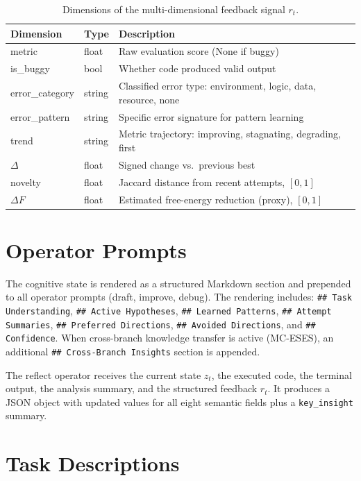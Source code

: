 \documentclass{article} %
\newcommand{\zt}{z_t}
\newcommand{\rt}{r_t}
\begin{document}
\begin{table}[ht]
\centering
\caption{Dimensions of the multi-dimensional feedback signal $\rt$.}
\label{tab:feedback_fields}
\small
\begin{tabular}{@{}llp{5.5cm}@{}}
\toprule
\textbf{Dimension} & \textbf{Type} & \textbf{Description} \\
\midrule
metric          & float  & Raw evaluation score (None if buggy) \\
is\_buggy       & bool   & Whether code produced valid output \\
error\_category & string & Classified error type: environment,
logic, data, resource, none \\
error\_pattern  & string & Specific error signature for pattern
learning \\
trend           & string & Metric trajectory: improving,
stagnating, degrading, first \\
$\Delta$        & float  & Signed change vs.\ previous best \\
novelty         & float  & Jaccard distance from recent attempts,
$[0, 1]$ \\
$\Delta F$      & float  & Estimated free-energy reduction (proxy),
$[0, 1]$ \\
\bottomrule
\end{tabular}
\end{table}


\section{Operator Prompts}
\label{sec:app_prompts}

The cognitive state is rendered as a structured Markdown section and prepended
to all operator prompts (draft, improve, debug). The rendering includes:
\texttt{\#\# Task Understanding}, \texttt{\#\# Active Hypotheses},
\texttt{\#\# Learned Patterns}, \texttt{\#\# Attempt Summaries},
\texttt{\#\# Preferred Directions}, \texttt{\#\# Avoided Directions},
and \texttt{\#\# Confidence}. When
cross-branch knowledge transfer is active (MC-ESES), an additional
\texttt{\#\# Cross-Branch Insights} section is appended.

The reflect operator receives the current state $\zt$, the executed code, the
terminal output, the analysis summary, and the structured feedback $\rt$. It
produces a JSON object with updated values for all eight semantic fields plus a
\texttt{key\_insight} summary.


\section{Task Descriptions}
\label{sec:app_tasks}
\end{document}
